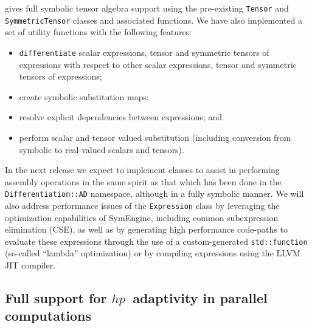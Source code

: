 \documentclass{ansarticle-preprint}
\begin{document}
gives full symbolic tensor algebra support using the pre-existing \texttt{Tensor}
and \texttt{SymmetricTensor} classes and associated functions. We have
also implemented a set of utility functions with the following features:
\begin{itemize}
\item \texttt{differentiate} scalar expressions, tensor and symmetric tensors of expressions
with respect to other scalar expressions, tensor and symmetric tensors of expressions;
\item create symbolic substitution maps;
\item resolve explicit dependencies between expressions; and
\item perform scalar and tensor valued substitution (including conversion from symbolic to
real-valued scalars and tensors).
\end{itemize}

In the next release we expect to implement classes to assist in performing assembly operations
in the same spirit as that which has been done in the \texttt{Differentiation::AD} namespace,
although in a fully symbolic manner.
We will also address performance issues of the \texttt{Expression} class by leveraging
the optimization capabilities of SymEngine, including common subexpression elimination (CSE),
as well as by generating high performance code-paths to evaluate these expressions through the
use of a custom-generated \texttt{std::function} (so-called ``lambda'' optimization) or by
compiling expressions using the LLVM JIT compiler.

\subsection{Full support for $hp$~adaptivity in parallel computations}
\label{subsec:hp}
\end{document}
